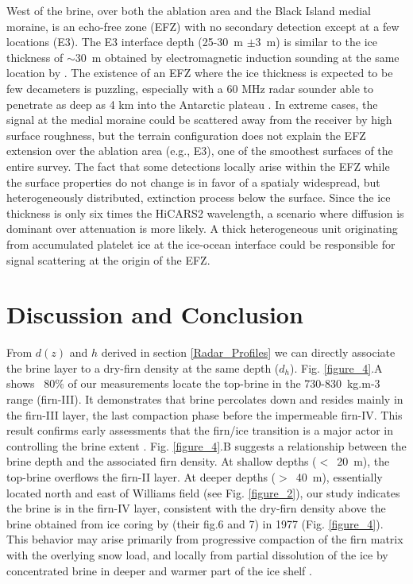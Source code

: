 \documentclass[draft,grl]{agutex}
\begin{document}
\begin{article}
West of the brine, over both the ablation area and the Black Island medial moraine, is an echo-free zone (EFZ) with no secondary detection except at a few locations (E3). The E3 interface depth (25-30~m $\pm$3~m) is similar to the ice thickness of $\sim$30~m obtained by electromagnetic induction sounding at the same location by \citet{Rack-2013-ID898}. The existence of an EFZ where the ice thickness is expected to be few decameters is puzzling, especially with a 60 MHz radar sounder able to penetrate as deep as 4 km into the Antarctic plateau \citep{Fretwell-2013-ID213}. In extreme cases, the signal at the medial moraine could be scattered away from the receiver by high surface roughness, but the terrain configuration does not explain the EFZ extension over the ablation area (e.g., E3), one of the smoothest surfaces of the entire survey. The fact that some detections locally arise within the EFZ while the surface properties do not change is in favor of a spatialy widespread, but heterogeneously distributed, extinction process below the surface. Since the ice thickness is only six times the HiCARS2 wavelength, a scenario where diffusion is dominant over attenuation is more likely. A thick heterogeneous unit originating from accumulated platelet ice at the ice-ocean interface \citep{Robinson-2010-ID903,Rack-2013-ID898} could be responsible for signal scattering at the origin of the EFZ.



\section{Discussion and Conclusion}
From $d(z)$ and $h$ derived in section \ref{Radar_Profiles} we can directly associate the brine layer to a dry-firn density at the same depth ($d_h$). Fig. \ref{figure_4}.A shows ~80$\%$ of our measurements locate the top-brine in the 730-830~kg.m{-3} range (firn-III). It demonstrates that brine percolates down and resides mainly in the firn-III layer, the last compaction phase before the impermeable firn-IV. This result confirms early assessments that the firn/ice transition is a major actor in controlling the brine extent \citep{Kovacs-1982-ID701}. Fig. \ref{figure_4}.B suggests a relationship between the brine depth and the associated firn density. At shallow depths ($<$~20~m), the top-brine overflows the firn-II layer. At deeper depths ($>$~40~m), essentially located north and east of Williams field (see Fig. \ref{figure_2}), our study indicates the brine is in the firn-IV layer, consistent with the dry-firn density above the brine obtained from ice coring by \citet{Kovacs-1982-ID701} (their fig.6 and 7) in 1977 (Fig. \ref{figure_4}). This behavior may arise primarily from progressive compaction of the firn matrix with the overlying snow load, and locally from partial dissolution of the ice by concentrated brine in deeper and warmer part of the ice shelf \citep{Kovacs-1982-ID701}.


\end{article}
\end{document}
